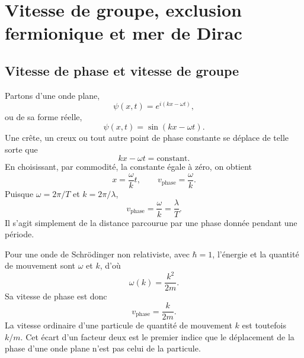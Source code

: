 \chapter{Vitesse de groupe, exclusion fermionique et mer de Dirac}

\section{Vitesse de phase et vitesse de groupe}

\begin{classroomqa}
\end{classroomqa}

Partons d’une onde plane,
\begin{equation}
\psi(x,t)=e^{i(kx-\omega t)},
\end{equation}
ou de sa forme réelle,
\begin{equation}
\psi(x,t)=\sin(kx-\omega t).
\end{equation}
Une crête, un creux ou tout autre point de phase constante se déplace de telle sorte que
\begin{equation}
kx-\omega t=\text{constant}.
\end{equation}
En choisissant, par commodité, la constante égale à zéro, on obtient
\begin{equation}
x=\frac{\omega}{k}t,
\qquad
v_{\mathrm{phase}}=\frac{\omega}{k}.
\end{equation}
Puisque \(\omega=2\pi/T\) et \(k=2\pi/\lambda\),
\begin{equation}
v_{\mathrm{phase}}=\frac{\omega}{k}=\frac{\lambda}{T}.
\end{equation}
Il s’agit simplement de la distance parcourue par une phase donnée pendant une période.

Pour une onde de Schr\"odinger non relativiste, avec \(\hbar=1\), l’énergie et la quantité de mouvement sont \(\omega\) et \(k\), d’où
\begin{equation}
\omega(k)=\frac{k^2}{2m}.
\end{equation}
Sa vitesse de phase est donc
\begin{equation}
v_{\mathrm{phase}}=\frac{k}{2m}.
\end{equation}
La vitesse ordinaire d’une particule de quantité de mouvement \(k\) est toutefois \(k/m\). Cet écart d’un facteur deux est le premier indice que le déplacement de la phase d’une onde plane n’est pas celui de la particule.

